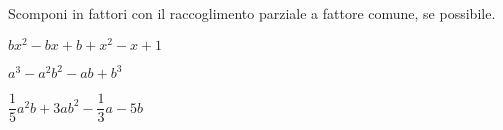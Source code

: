 \begin{esercizio}[*]
\label{ese:div.015}
Scomponi in fattori con il raccoglimento parziale a fattore comune, se 
possibile.
\begin{enumeratea}
\item \(bx^{2}-bx+b+x^{2}-x+1\) 
\item \(a^{3}-a^{2}b^{2}-ab+b^{3}\) 
\item \(\dfrac{1}{5}a^{2}b+3ab^{2}-\dfrac{1}{3}a-5b\) 
\end{enumeratea}
\end{esercizio}
% 
% 
% 
